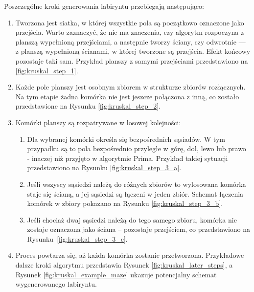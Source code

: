 Poszczególne kroki generowania labiryntu przebiegają następująco:
\begin{enumerate}
    \item Tworzona jest siatka, w której wszystkie pola są początkowo oznaczone jako przejścia. Warto zaznaczyć, że nie ma znaczenia, czy algorytm rozpoczyna z planszą wypełnioną przejściami, a następnie tworzy ściany, czy odwrotnie — z planszą wypełnioną ścianami, w której tworzone są przejścia. Efekt końcowy pozostaje taki sam. Przykład planszy z samymi przejściami przedstawiono na \ref{fig:kruskal_step_1}.

    

    \item Każde pole planszy jest osobnym zbiorem w strukturze zbiorów rozłącznych. Na tym etapie żadna komórka nie jest jeszcze połączona z inną, co zostało przedstawione na Rysunku \ref{fig:kruskal_step_2}.

    

    \item Komórki planszy są rozpatrywane w losowej kolejności:
    \begin{enumerate}
        \item Dla wybranej komórki określa się bezpośrednich sąsiadów. W tym przypadku są to pola bezpośrednio przyległe w górę, doł, lewo lub prawo - inaczej niż przyjęto w algorytmie Prima. Przykład takiej sytuacji przedstawiono na Rysunku \ref{fig:kruskal_step_3_a}.
        
        

        \item Jeśli wszyscy sąsiedzi należą do różnych zbiorów to wylosowana komórka staje się ścianą, a jej sąsiedzi są łączeni w jeden zbiór. Schemat łączenia komórek w zbiory pokazano na Rysunku \ref{fig:kruskal_step_3_b}.

        

        \item Jeśli chociaż dwaj sąsiedzi należą do tego samego zbioru, komórka nie zostaje oznaczona jako ściana – pozostaje przejściem, co przedstawiono na Rysunku~\ref{fig:kruskal_step_3_c}.

        
    \end{enumerate}

    \item Proces powtarza się, aż każda komórka zostanie przetworzona. Przykładowe dalsze kroki algorytmu przedstawia Rysunek \ref{fig:kruskal_later_steps}, a Rysunek \ref{fig:kruskal_example_maze} ukazuje potencjalny schemat wygenerowanego labiryntu.
    
    

    
\end{enumerate}